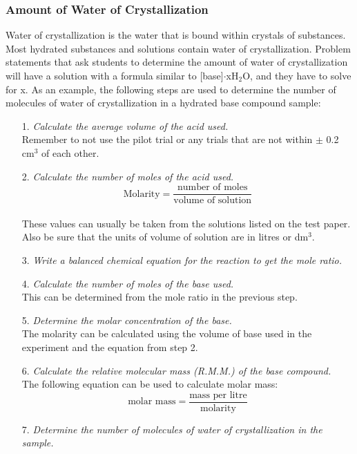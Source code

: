 \subsubsection{Amount of Water of Crystallization}

Water of crystallization is the water that is bound within crystals of substances. Most hydrated substances and solutions contain water of crystallization. Problem statements that ask students to determine the amount of water of crystallization will have a solution with a formula similar to [base]$\cdot$xH$_2$O, and they have to solve for x. As an example, the following steps are used to determine the number of molecules of water of crystallization in a hydrated base compound sample:

\begin{enumerate}
\item[1.] \textit{Calculate the average volume of the acid used.}\\
Remember to not use the pilot trial or any trials that are not within $\pm$ 0.2 cm$^3$ of each other.
\item[2.] \textit{Calculate the number of moles of the acid used.}\\
$$\text{Molarity} = \frac{\text{number of moles}}{\text{volume of solution}}$$\\
These values can usually be taken from the solutions listed on the test paper. Also be sure that the units of volume of solution are in litres or dm$^3$.
\item[3.] \textit{Write a balanced chemical equation for the reaction to get the mole ratio.}
\item[4.] \textit{Calculate the number of moles of the base used.}\\
This can be determined from the mole ratio in the previous step.
\item[5.] \textit{Determine the molar concentration of the base.}\\
The molarity can be calculated using the volume of base used in the experiment and the equation from step 2.
\item[6.] \textit{Calculate the relative molecular mass (R.M.M.) of the base compound.}\\
The following equation can be used to calculate molar mass:\\
$$\text{molar mass} = \frac{\text{mass per litre}}{\text{molarity}}$$
\item[7.] \textit{Determine the number of molecules of water of crystallization in the sample.}\\

\end{enumerate}
